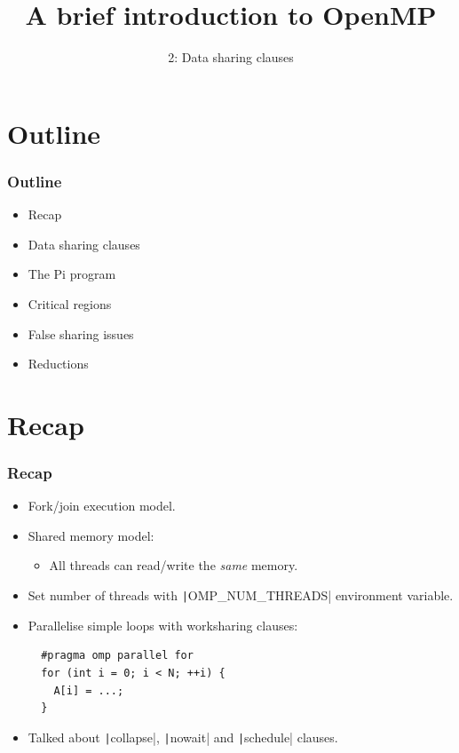 \documentclass{beamer}
\title{A brief introduction to OpenMP}
\subtitle{2: Data sharing clauses}
\begin{document}
\frame{\titlepage}


\section{Outline}
\begin{frame}
\frametitle{Outline}
\begin{itemize}
  \item Recap
  \item Data sharing clauses
  \item The Pi program
  \item Critical regions
  \item False sharing issues
  \item Reductions
\end{itemize}
\end{frame}
\section{Recap}
\begin{frame}[fragile]
\frametitle{Recap}
\begin{itemize}
  \item Fork/join execution model.

  \item Shared memory model:
    \begin{itemize}
      \item All threads can read/write the \emph{same} memory.
    \end{itemize}

  \item Set number of threads with \texttt|OMP_NUM_THREADS| environment variable.

  \item Parallelise simple loops with worksharing clauses:
  \begin{verbatim}
  #pragma omp parallel for
  for (int i = 0; i < N; ++i) {
    A[i] = ...;
  }
  \end{verbatim}

  \item Talked about \texttt|collapse|, \texttt|nowait| and \texttt|schedule| clauses.

\end{itemize}
\end{frame}
\end{document}
